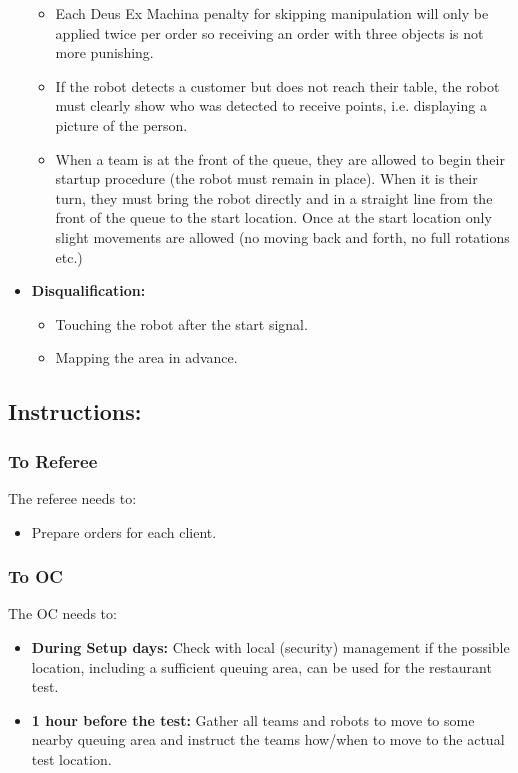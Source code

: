 \begin{itemize}
\begin{itemize}
		\item Each Deus Ex Machina penalty for skipping manipulation will only be applied twice per order so receiving an order with three objects is not more punishing.
		\item If the robot detects a customer but does not reach their table, the robot must clearly show who was detected to receive points, i.e. displaying a picture of the person.
		\item When a team is at the front of the queue, they are allowed to begin their startup procedure (the robot must remain in place). When it is their turn, they must bring the robot directly and in a straight line from the front of the queue to the start location. Once at the start location only slight movements are allowed (no moving back and forth, no full rotations etc.)
	\end{itemize}
	\item \textbf{Disqualification:}
	\begin{itemize}
		\item Touching the robot after the start signal.
		\item Mapping the area in advance.
	\end{itemize}
\end{itemize}

\subsection*{Instructions:}

\subsubsection*{To Referee}

The referee needs to:
\begin{itemize}
	\item Prepare orders for each client.
\end{itemize}

\subsubsection*{To OC}
The OC needs to:
\begin{itemize}[nosep]
	\item \textbf{During Setup days:} Check with local (security) management if the possible location, including a sufficient queuing area, can be used for the restaurant test.
	\item \textbf{1 hour before the test:} Gather all teams and robots to move to some nearby queuing area and instruct the teams how/when to move to the actual test location.
\end{itemize}

